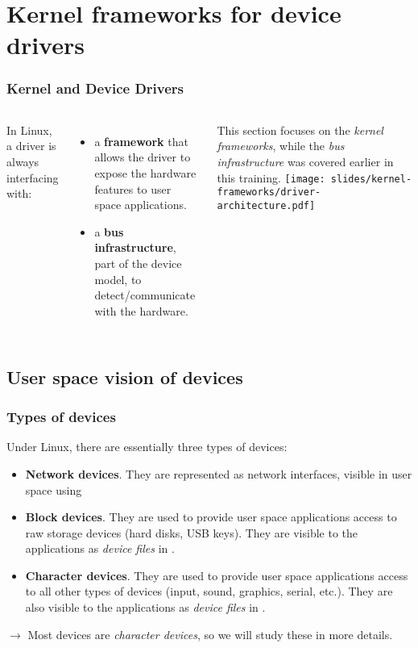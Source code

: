 \section{Kernel frameworks for device drivers}

\begin{frame}
  \frametitle{Kernel and Device Drivers}
  \begin{columns}
     In Linux, a driver is always interfacing
    with:
    \begin{itemize}
    \item a {\bf framework} that allows the driver to expose the
      hardware features to user space applications.
    \item a {\bf bus infrastructure}, part of the device model, to
      detect/communicate with the hardware.
    \end{itemize}
    This section focuses on the {\em kernel frameworks}, while the
    {\em bus infrastructure} was covered earlier in this training.
    \texttt{[image: slides/kernel-frameworks/driver-architecture.pdf]}
  \end{columns}
\end{frame}

\subsection{User space vision of devices}

\begin{frame}
  \frametitle{Types of devices} Under Linux, there are essentially
  three types of devices:
  \begin{itemize}
  \item {\bf Network devices}. They are represented as network
    interfaces, visible in user space using 
  \item {\bf Block devices}. They are used to provide user space
    applications access to raw storage devices (hard disks, USB
    keys). They are visible to the applications as {\em device files}
    in .
  \item {\bf Character devices}. They are used to provide user space
    applications access to all other types of devices (input, sound,
    graphics, serial, etc.). They are also visible to the applications
    as {\em device files} in .
  \end{itemize}
  $\rightarrow$ Most devices are {\em character devices}, so we will
  study these in more details.
\end{frame}

